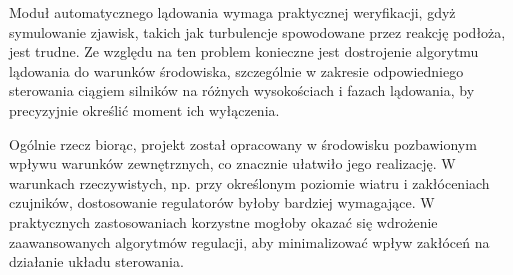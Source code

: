 \documentclass[polish,11pt,a4paper]{article}
\begin{document}
Moduł automatycznego lądowania wymaga praktycznej weryfikacji, gdyż symulowanie
 zjawisk, takich jak turbulencje spowodowane przez reakcję podłoża, jest trudne.
  Ze względu na ten problem konieczne jest dostrojenie algorytmu lądowania do warunków
   środowiska, szczególnie w zakresie odpowiedniego sterowania ciągiem silników na różnych
    wysokościach i fazach lądowania, by precyzyjnie określić moment ich wyłączenia.

Ogólnie rzecz biorąc, projekt został opracowany w środowisku pozbawionym wpływu
 warunków zewnętrznych, co znacznie ułatwiło jego realizację. W warunkach rzeczywistych,
  np. przy określonym poziomie wiatru i zakłóceniach czujników, dostosowanie regulatorów
   byłoby bardziej wymagające. W praktycznych zastosowaniach korzystne mogłoby okazać się 
   wdrożenie zaawansowanych algorytmów regulacji, aby minimalizować wpływ zakłóceń na działanie 
   układu sterowania.
\clearpage
   
\end{document}

